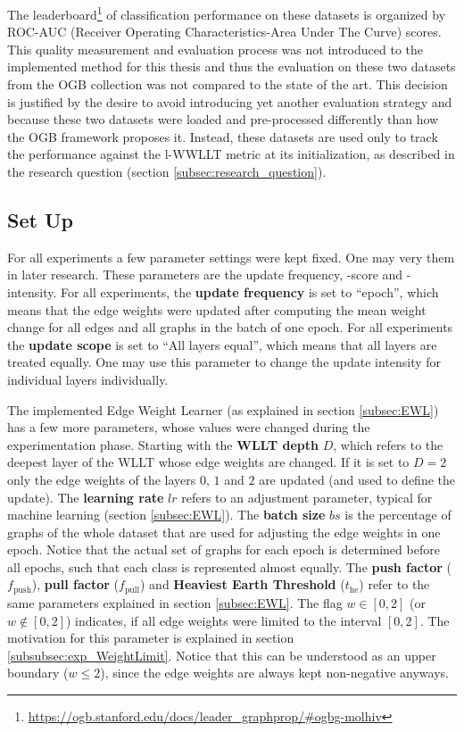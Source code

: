 			The leaderboard\footnote{\url{https://ogb.stanford.edu/docs/leader_graphprop/\#ogbg-molhiv}} of classification performance on these datasets is organized by ROC-AUC (Receiver Operating Characteristics-Area Under The Curve) scores.
			This quality measurement and evaluation process was not introduced to the implemented method for this thesis and thus the evaluation on these two datasets from the OGB collection was not compared to the state of the art.
			This decision is justified by the desire to avoid introducing yet another evaluation strategy and because these two datasets were loaded and pre-processed differently than how the OGB framework proposes it.			
			Instead, these datasets are used only to track the performance against the l-WWLLT metric at its initialization, as described in the research question (section \ref{subsec:research_question}). 
			
	\subsection{Set Up} \label{subsec:exp_setup}
	
		For all experiments a few parameter settings were kept fixed.
		One may very them in later research.
		These parameters are the update frequency, -score and -intensity.
		For all experiments, the \textbf{update frequency} is set to \enquote{epoch}, which means that the edge weights were updated after computing the mean weight change for all edges and all graphs in the batch of one epoch. 
		For all experiments the \textbf{update scope} is set to \enquote{All layers equal}, which means that all layers are treated equally. One may use this parameter to change the update intensity for individual layers individually.
		
		The implemented Edge Weight Learner (as explained in section \ref{subsec:EWL}) has a few more parameters, whose values were changed during the experimentation phase.	
		Starting with the \textbf{WLLT depth} $D$, which refers to the deepest layer of the WLLT whose edge weights are changed.
		If it is set to $D=2$ only the edge weights of the layers $0$, $1$ and $2$ are updated (and used to define the update).
		The \textbf{learning rate} $lr$ refers to an adjustment parameter, typical for machine learning (section \ref{subsec:EWL}).
		The \textbf{batch size} $bs$ is the percentage of graphs of the whole dataset that are used for adjusting the edge weights in one epoch.
		Notice that the actual set of graphs for each epoch is determined before all epochs, such that each class is represented almost equally.
		The \textbf{push factor} ($f_{\text{push}}$), \textbf{pull factor} ($f_{\text{pull}}$) and \textbf{Heaviest Earth Threshold} ($t_{\text{he}}$) refer to the same parameters explained in section \ref{subsec:EWL}.
		The flag \textbf{$w\in[0,2]$} (or $w\notin[0,2]$) indicates, if all edge weights were limited to the interval $[0, 2]$. 
		The motivation for this parameter is explained in section \ref{subsubsec:exp_WeightLimit}.
		Notice that this can be understood as an upper boundary ($w\le 2$), since the edge weights are always kept non-negative anyways.
					
